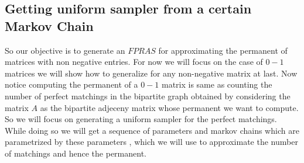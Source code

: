 \subsection{Getting uniform sampler from a certain Markov Chain}
\begin{flushleft}
	So our objective is to generate an $FPRAS$ for approximating the permanent of matrices with non negative entries. For now we will focus on the case of $0-1$ matrices we will show how to generalize for any non-negative matrix at last.
	Now notice computing the permanent of a $0-1$ matrix is same as counting the number of perfect matchings in the bipartite graph obtained by considering the  matrix $A$ as the bipartite adjeceny matrix whose permanent we want to compute. So we will focus on generating a uniform sampler for the perfect matchings. While doing so we will get a sequence of parameters and  markov chains which are parametrized by these parameters , which we will use to approximate the number of matchings and hence the permanent.
	
\end{flushleft}

